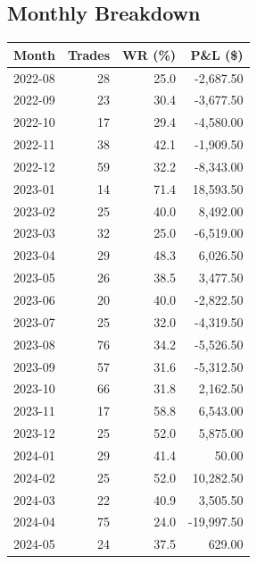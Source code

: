 \documentclass[11pt,a4paper,twoside]{article}
\begin{document}
\subsection{Monthly Breakdown}
\noindent\begin{center}
\begin{tabular}{>{\color{txtmain}}l rrr}
\toprule
\rowcolor{cardbg}
\textbf{Month} & \textbf{Trades} & \textbf{WR (\%)} & \textbf{P\&L (\$)} \\
\midrule
2022-08 & 28 & 25.0 & \textcolor{lossred}{-2,687.50} \\
2022-09 & 23 & 30.4 & \textcolor{lossred}{-3,677.50} \\
2022-10 & 17 & 29.4 & \textcolor{lossred}{-4,580.00} \\
2022-11 & 38 & 42.1 & \textcolor{lossred}{-1,909.50} \\
2022-12 & 59 & 32.2 & \textcolor{lossred}{-8,343.00} \\
2023-01 & 14 & 71.4 & \textcolor{wingreen}{18,593.50} \\
2023-02 & 25 & 40.0 & \textcolor{wingreen}{8,492.00} \\
2023-03 & 32 & 25.0 & \textcolor{lossred}{-6,519.00} \\
2023-04 & 29 & 48.3 & \textcolor{wingreen}{6,026.50} \\
2023-05 & 26 & 38.5 & \textcolor{wingreen}{3,477.50} \\
2023-06 & 20 & 40.0 & \textcolor{lossred}{-2,822.50} \\
2023-07 & 25 & 32.0 & \textcolor{lossred}{-4,319.50} \\
2023-08 & 76 & 34.2 & \textcolor{lossred}{-5,526.50} \\
2023-09 & 57 & 31.6 & \textcolor{lossred}{-5,312.50} \\
2023-10 & 66 & 31.8 & \textcolor{wingreen}{2,162.50} \\
2023-11 & 17 & 58.8 & \textcolor{wingreen}{6,543.00} \\
2023-12 & 25 & 52.0 & \textcolor{wingreen}{5,875.00} \\
2024-01 & 29 & 41.4 & \textcolor{wingreen}{50.00} \\
2024-02 & 25 & 52.0 & \textcolor{wingreen}{10,282.50} \\
2024-03 & 22 & 40.9 & \textcolor{wingreen}{3,505.50} \\
2024-04 & 75 & 24.0 & \textcolor{lossred}{-19,997.50} \\
2024-05 & 24 & 37.5 & \textcolor{wingreen}{629.00} \\

\end{tabular}
\end{center}
\end{document}
